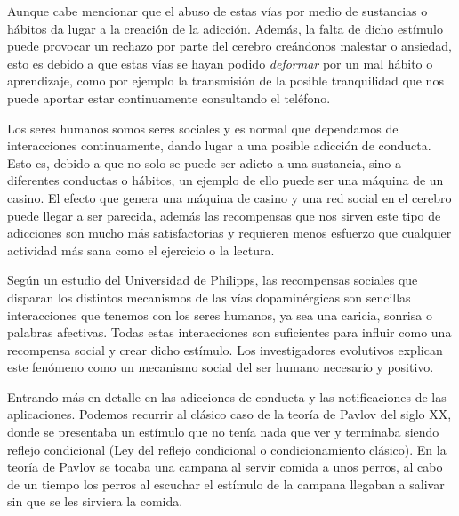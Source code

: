 \vspace{0.3cm}

Aunque cabe mencionar que el abuso de estas vías por medio de sustancias o hábitos da lugar a la creación de la adicción. Además, la falta de dicho estímulo puede provocar un rechazo por parte del cerebro creándonos malestar o ansiedad, esto es debido a que estas vías se hayan podido \textit{deformar} por un mal hábito o aprendizaje, como por ejemplo la transmisión de la posible tranquilidad que nos puede aportar estar continuamente consultando el teléfono.

\vspace{0.3cm}

Los seres humanos somos seres sociales y es normal que dependamos de interacciones continuamente, dando lugar a una posible adicción de conducta. Esto es, debido a que no solo se puede ser adicto a una sustancia, sino a diferentes conductas o hábitos, un ejemplo de ello puede ser una máquina de un casino. El efecto que genera una máquina de casino y una red social en el cerebro puede llegar a ser parecida, además las recompensas que nos sirven este tipo de adicciones son mucho más satisfactorias y requieren menos esfuerzo que cualquier actividad más sana como el ejercicio o la lectura. \cite{quintero2021que}

\vspace{0.3cm}

Según un estudio del Universidad de Philipps, las recompensas sociales que disparan los distintos mecanismos de las vías dopaminérgicas son sencillas interacciones que tenemos con los seres humanos, ya sea una caricia, sonrisa o palabras afectivas. Todas estas interacciones son suficientes para influir como una recompensa social y crear dicho estímulo. Los investigadores evolutivos explican este fenómeno como un mecanismo social del ser humano necesario y positivo. \cite{Frontiers-RRSS-AS}

\vspace{0.3cm}

Entrando más en detalle en las adicciones de conducta y las notificaciones de las aplicaciones. Podemos recurrir al clásico caso de la teoría de Pavlov del siglo XX, donde se presentaba un estímulo que no tenía nada que ver y terminaba siendo reflejo condicional (Ley del reflejo condicional o condicionamiento clásico). En la teoría de Pavlov se tocaba una campana al servir comida a unos perros, al cabo de un tiempo los perros al escuchar el estímulo de la campana llegaban a salivar sin que se les sirviera la comida. \cite{Pavlov-RRSS-AS}

